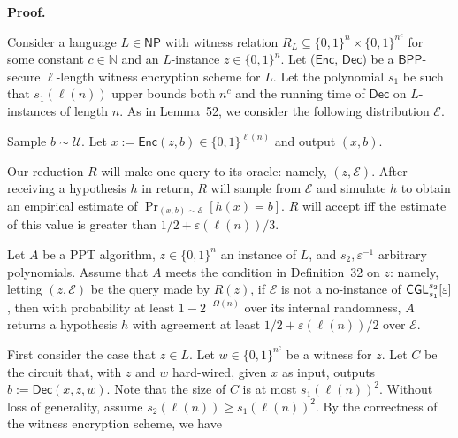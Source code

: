 \documentclass[10pt,a4paper]{article}
\begin{document}



\par\medskip\noindent\textbf{Proof.}\par




Consider a language $L\in{\mathsf{NP}}$ with witness relation $R_{L}\subseteq\{0,1\}^{n}\times\{0,1\}^{n^{c}}$ for some constant $c\in\mathbb{N}$ and an $L$-instance $z\in\{0,1\}^{n}$. Let (${\mathsf{Enc}}$, ${\mathsf{Dec}}$) be a ${\mathsf{BPP}}$-secure $\ell$-length witness encryption scheme for $L$. Let the polynomial $s_{1}$ be such that $s_{1}(\ell(n))$ upper bounds both $n^{c}$ and the running time of ${\mathsf{Dec}}$ on $L$-instances of length $n$. As in Lemma 52, we consider the following distribution $\mathcal{E}$.\par



Sample $b\sim\mathcal{U}$. Let $x:={\mathsf{Enc}}(z,b)\in\{0,1\}^{\ell(n)}$ and output $(x,b)$.\par



Our reduction $R$ will make one query to its oracle: namely, $(z,\mathcal{E})$. After receiving a hypothesis $h$ in return, $R$ will sample from $\mathcal{E}$ and simulate $h$ to obtain an empirical estimate of $\Pr_{(x,b)\sim\mathcal{E}}[h(x)=b]$. $R$ will accept iff the estimate of this value is greater than $1/2+\varepsilon(\ell(n))/3$.\par




Let $A$ be a PPT algorithm, $z\in\{0,1\}^{n}$ an instance of $L$, and $s_{2},\varepsilon^{-1}$ arbitrary polynomials. Assume that $A$ meets the condition in Definition 32 on $z$: namely, letting $(z,\mathcal{E})$ be the query made by $R(z)$, if $\mathcal{E}$ is not a no-instance of ${\sf CGL}_{s_{1}}^{s_{2}}[\varepsilon]$, then with probability at least $1-2^{-\Omega(n)}$ over its internal randomness, $A$ returns a hypothesis $h$ with agreement at least $1/2+\varepsilon(\ell(n))/2$ over $\mathcal{E}$.\par




First consider the case that $z\in L$. Let $w\in\{0,1\}^{n^{c}}$ be a witness for $z$. Let $C$ be the circuit that, with $z$ and $w$ hard-wired, given $x$ as input, outputs $b:={\mathsf{Dec}}(x,z,w)$. Note that the size of $C$ is at most $s_{1}(\ell(n))^{2}$. Without loss of generality, assume $s_{2}(\ell(n))\geq s_{1}(\ell(n))^{2}$. By the correctness of the witness encryption scheme, we have\par
\end{document}
